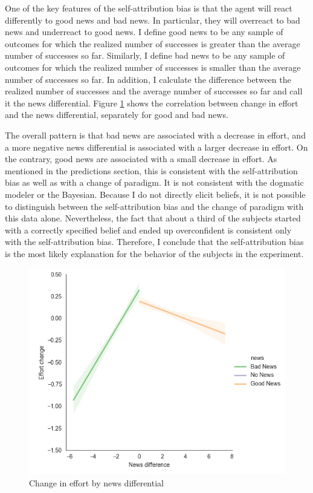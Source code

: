 \documentclass[
  12pt,
]{article}
\begin{document}
One of the key features of the self-attribution bias is that the agent
will react differently to good news and bad news. In particular, they
will overreact to bad news and underreact to good news. I define good
news to be any sample of outcomes for which the realized number of
successes is greater than the average number of successes so far.
Similarly, I define bad news to be any sample of outcomes for which the
realized number of successes is smaller than the average number of
successes so far. In addition, I calculate the difference between the
realized number of successes and the average number of successes so far
and call it the news differential. Figure \ref{fig:good-bad-news} shows
the correlation between change in effort and the news differential,
separately for good and bad news.

The overall pattern is that bad news are associated with a decrease in
effort, and a more negative news differential is associated with a
larger decrease in effort. On the contrary, good news are associated
with a small decrease in effort. As mentioned in the predictions
section, this is consistent with the self-attribution bias as well as
with a change of paradigm. It is not consistent with the dogmatic
modeler or the Bayesian. Because I do not directly elicit beliefs, it is
not possible to distinguish between the self-attribution bias and the
change of paradigm with this data alone. Nevertheless, the fact that
about a third of the subjects started with a correctly specified belief
and ended up overconfident is consistent only with the self-attribution
bias. Therefore, I conclude that the self-attribution bias is the most
likely explanation for the behavior of the subjects in the experiment.

\begin{figure}
\hypertarget{fig:good-bad-news}{%
\centering
\includegraphics{../figures/effort_change_news.png}
\caption{Change in effort by news differential}\label{fig:good-bad-news}
}
\end{figure}
\end{document}
